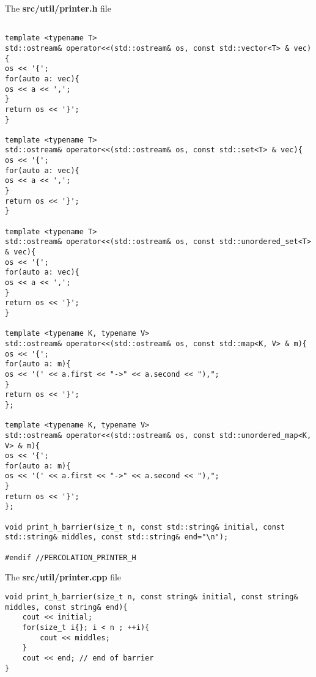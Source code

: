 
The \textbf{src/util/printer.h} file

\begin{lstlisting}[style=CStyle]

template <typename T>
std::ostream& operator<<(std::ostream& os, const std::vector<T> & vec){
os << '{';
for(auto a: vec){
os << a << ',';
}
return os << '}';
}

template <typename T>
std::ostream& operator<<(std::ostream& os, const std::set<T> & vec){
os << '{';
for(auto a: vec){
os << a << ',';
}
return os << '}';
}

template <typename T>
std::ostream& operator<<(std::ostream& os, const std::unordered_set<T> & vec){
os << '{';
for(auto a: vec){
os << a << ',';
}
return os << '}';
}

template <typename K, typename V>
std::ostream& operator<<(std::ostream& os, const std::map<K, V> & m){
os << '{';
for(auto a: m){
os << '(' << a.first << "->" << a.second << "),";
}
return os << '}';
};

template <typename K, typename V>
std::ostream& operator<<(std::ostream& os, const std::unordered_map<K, V> & m){
os << '{';
for(auto a: m){
os << '(' << a.first << "->" << a.second << "),";
}
return os << '}';
};

void print_h_barrier(size_t n, const std::string& initial, const std::string& middles, const std::string& end="\n");

#endif //PERCOLATION_PRINTER_H
\end{lstlisting}

The \textbf{src/util/printer.cpp} file

\begin{lstlisting}[style=CStyle]
void print_h_barrier(size_t n, const string& initial, const string& middles, const string& end){
	cout << initial;
	for(size_t i{}; i < n ; ++i){
		cout << middles;
	}
	cout << end; // end of barrier
}
\end{lstlisting}
